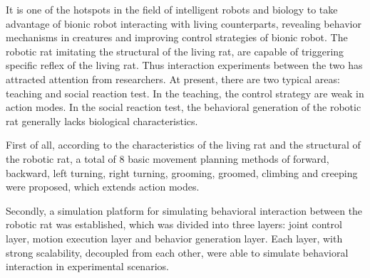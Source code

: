 \setlength{\parskip}{0em}
%
%

It is one of the hotspots in the field of intelligent robots and biology to take advantage of bionic robot interacting with living counterparts, revealing behavior mechanisms in creatures and improving control strategies of bionic robot. The robotic rat imitating the structural of the living rat, are capable of triggering specific reflex of the living rat. Thus interaction experiments between the two has attracted attention from researchers. At present, there are two typical areas: teaching and social reaction test. In the teaching, the control strategy are weak in action modes. In the social reaction test, the behavioral generation of the robotic rat generally lacks biological characteristics.

First of all, according to the characteristics of the living rat and the structural of the robotic rat, a total of 8 basic movement planning methods of forward, backward, left turning, right turning, grooming, groomed, climbing and creeping were proposed, which extends action modes.

Secondly, a simulation platform for simulating behavioral interaction between the robotic rat was established, which was divided into three layers: joint control layer, motion execution layer and behavior generation layer. Each layer, with strong scalability, decoupled from each other, were able to simulate behavioral interaction in experimental scenarios.


